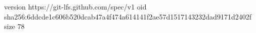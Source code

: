 version https://git-lfs.github.com/spec/v1
oid sha256:6ddcde1c606b520dcab47a4f474a614141f2ae57d1517143232dad9171d2402f
size 78

